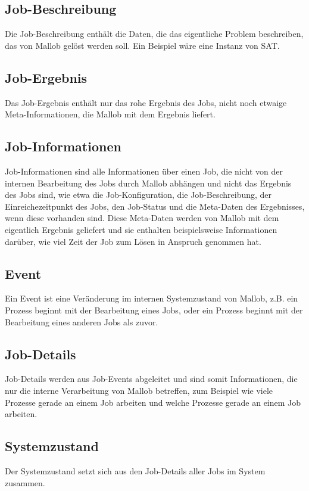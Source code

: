     
\subsection{Job-Beschreibung}
\label{B:Job-Beschreibung}
Die Job-Beschreibung enthält die Daten, die das eigentliche Problem beschreiben, das von Mallob gelöst werden soll. Ein Beispiel wäre eine Instanz von \gls{SAT}.
\subsection{Job-Ergebnis}
\label{B:Job-Ergebnis}
Das Job-Ergebnis enthält nur das rohe Ergebnis des Jobs, nicht noch etwaige Meta-Informationen, die Mallob mit dem Ergebnis liefert.
\subsection{Job-Informationen}
\label{B:Job-Informationen}
Job-Informationen sind alle Informationen über einen Job, die nicht von der internen Bearbeitung des Jobs durch Mallob abhängen und nicht das Ergebnis des Jobs sind, wie etwa die Job-Konfiguration, die Job-Beschreibung, der Einreichezeitpunkt des Jobs, den Job-Status und die Meta-Daten des Ergebnisses, wenn diese vorhanden sind. Diese Meta-Daten werden von Mallob mit dem eigentlich Ergebnis geliefert und sie enthalten beispielsweise Informationen darüber, wie viel Zeit der Job zum Lösen in Anspruch genommen hat.

\subsection{Event}
\label{B:Event}
Ein Event ist eine Veränderung im internen Systemzustand von Mallob, z.B. ein Prozess beginnt mit der Bearbeitung eines Jobs, oder ein Prozess beginnt mit der Bearbeitung eines anderen Jobs als zuvor. 

\subsection{Job-Details}
\label{B:Job-Details}
Job-Details werden aus Job-Events abgeleitet und sind somit Informationen, die nur die interne Verarbeitung von Mallob betreffen, zum Beispiel wie viele Prozesse gerade an einem Job arbeiten und welche Prozesse gerade an einem Job arbeiten. 

\subsection{Systemzustand}
\label{B:Systemzustand}
Der Systemzustand setzt sich aus den Job-Details aller Jobs im System zusammen.

